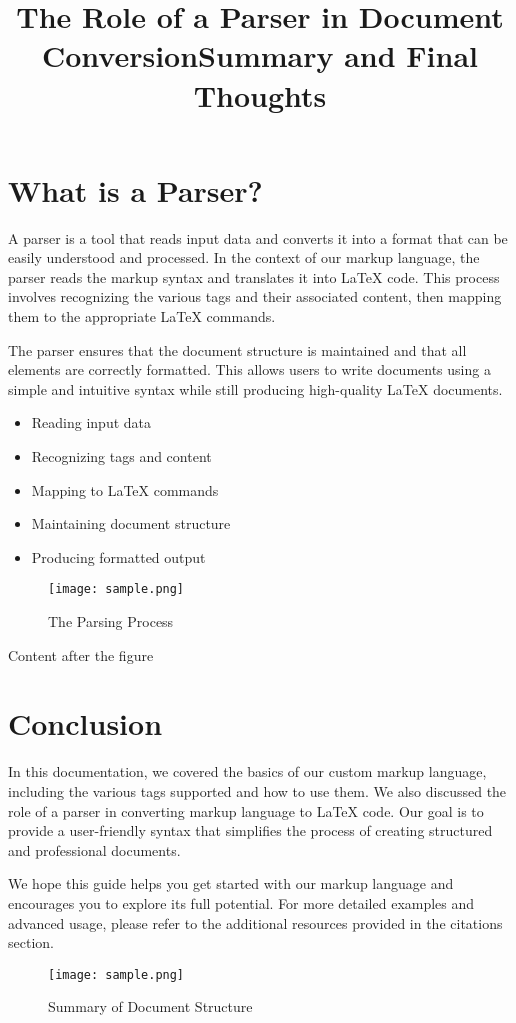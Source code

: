 \documentclass[oneside]{book}
\begin{document}
\section{What is a Parser?}
\title{The Role of a Parser in Document Conversion}
A parser is a tool that reads input data and converts it into a format that can be easily understood and processed. In the context of our markup language, the parser reads the markup syntax and translates it into LaTeX code. This process involves recognizing the various tags and their associated content, then mapping them to the appropriate LaTeX commands.\par
The parser ensures that the document structure is maintained and that all elements are correctly formatted. This allows users to write documents using a simple and intuitive syntax while still producing high-quality LaTeX documents.\par
\begin{itemize}
\item Reading input data
\item Recognizing tags and content
\item Mapping to LaTeX commands
\item Maintaining document structure
\item Producing formatted output
\end{itemize}
\begin{figure}[h]
\centering
\texttt{[image: sample.png]}
\caption{The Parsing Process}
\end{figure}Content after the figure\par

\newpage
\section{Conclusion}
\title{Summary and Final Thoughts}
In this documentation, we covered the basics of our custom markup language, including the various tags supported and how to use them. We also discussed the role of a parser in converting markup language to LaTeX code. Our goal is to provide a user-friendly syntax that simplifies the process of creating structured and professional documents.\par
We hope this guide helps you get started with our markup language and encourages you to explore its full potential. For more detailed examples and advanced usage, please refer to the additional resources provided in the citations section.\par
\begin{figure}[h]
\centering
\texttt{[image: sample.png]}
\caption{Summary of Document Structure}
\end{figure}
\newpage
\end{document}
